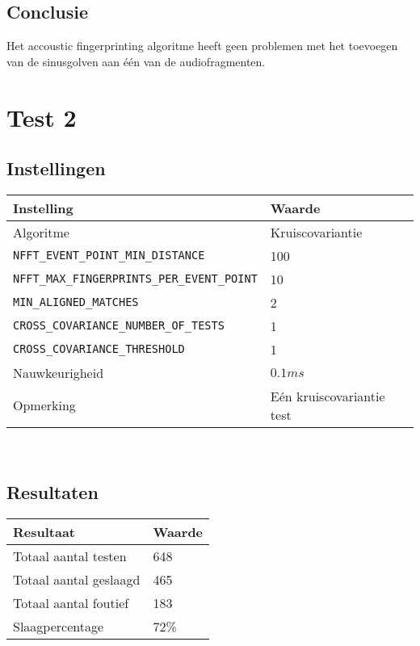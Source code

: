 \subsection*{Conclusie}

Het accoustic fingerprinting algoritme heeft geen problemen met het toevoegen van de sinusgolven aan één van de audiofragmenten.

\section*{Test 2}

\subsection*{Instellingen}

\begin{tabular}{ l  l}
	\hline
	\textbf{Instelling} & \textbf{Waarde} \\
	\hline
	Algoritme & Kruiscovariantie \\
	\texttt{NFFT\_EVENT\_POINT\_MIN\_DISTANCE} & 100 \\
	\texttt{NFFT\_MAX\_FINGERPRINTS\_PER\_EVENT\_POINT} & 10 \\
	\texttt{MIN\_ALIGNED\_MATCHES} & 2 \\
	\texttt{CROSS\_COVARIANCE\_NUMBER\_OF\_TESTS} & 1 \\
	\texttt{CROSS\_COVARIANCE\_THRESHOLD} & 1 \\
	Nauwkeurigheid & $0.1ms$ \\
	Opmerking & Eén kruiscovariantie test \\
\end{tabular}\\

\subsection*{Resultaten}

\begin{tabular}{ l  l}
	\hline
	\textbf{Resultaat} & \textbf{Waarde} \\
	\hline
	Totaal aantal testen & 648 \\
	Totaal aantal geslaagd & 465 \\
	Totaal aantal foutief & 183 \\
	Slaagpercentage & 72\% \\
\end{tabular}\\

